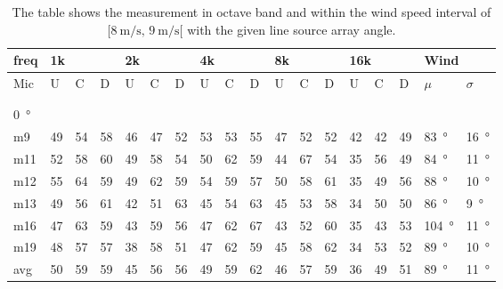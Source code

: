 \begin{table}[H]
\centering
\caption{The table shows the measurement in octave band and within the wind speed interval of $[\SI{8}{\meter\per\second},\, \SI{9}{\meter\per\second}[ $ with the given line source array angle.}
\setlength\tabcolsep{5pt} %
\begin{tabular}{l|l|l|l|l|l|l|l|l|l|l|l|l|l|l|l|l|l}
freq & \multicolumn{3}{l|}{1k} & \multicolumn{3}{l|}{2k} & \multicolumn{3}{l|}{4k} & \multicolumn{3}{l|}{8k} & \multicolumn{3}{l|}{16k}   &  \multicolumn{2}{l}{Wind}                      \\ \hline
Mic  & U      & C      & D     & U      & C      & D     & U      & C      & D     & U      & C      & D     & U  & C  & D & $\mu$ & $\sigma$ \\ \hline
 & \multicolumn{3}{l|}{} & \multicolumn{3}{l|}{} & \multicolumn{3}{l|}{} & \multicolumn{3}{l|}{} & \multicolumn{3}{l|}{} &      \multicolumn{2}{l}{}                        \\ 
 \multicolumn{18}{l}{ } \\  
\SI{0}{\degree}   & \multicolumn{3}{l|}{} & \multicolumn{3}{l|}{} & \multicolumn{3}{l|}{} & \multicolumn{3}{l|}{} & \multicolumn{3}{l|}{} & \multicolumn{2}{l}{}   \\  \hline
m9   & 49     & 54     & 58    & 46     & 47     & 52    & 53     & 53     & 55    & 47     & 52     & 52    & 42 & 42 & 49  & \SI{83}{\degree} & \SI{16}{\degree}  \\
m11  & 52     & 58     & 60    & 49     & 58     & 54    & 50     & 62     & 59    & 44     & 67     & 54    & 35 & 56 & 49   & \SI{84}{\degree} & \SI{11}{\degree}  \\
m12  & 55     & 64     & 59    & 49     & 62     & 59    & 54     & 59     & 57    & 50     & 58     & 61    & 35 & 49 & 56   & \SI{88}{\degree} & \SI{10}{\degree}  \\
m13  & 49     & 56     & 61    & 42     & 51     & 63    & 45     & 54     & 63    & 45     & 53     & 58    & 34 & 50 & 50   & \SI{86}{\degree} & \SI{9}{\degree}  \\
m16  & 47     & 63     & 59    & 43     & 59     & 56    & 47     & 62     & 67    & 43     & 52     & 60    & 35 & 43 & 53   & \SI{104}{\degree} & \SI{11}{\degree}  \\
m19  & 48     & 57     & 57    & 38     & 58     & 51    & 47     & 62     & 59    & 45     & 58     & 62    & 34 & 53 & 52   & \SI{89}{\degree} & \SI{10}{\degree}  \\ \hline
avg  &  50    &  59    & 59    &  45     &  56    &  56   & 49     & 59     & 62    & 46     & 57     & 59    & 36   & 49   & 51   & \SI{89}{\degree} & \SI{11}{\degree}  \\ \hline  

\end{tabular}
\end{table}
